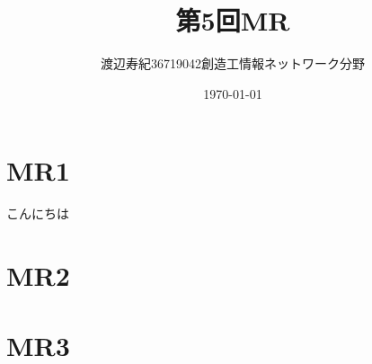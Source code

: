 \documentclass[12pt]{jarticle}
\title{第5回MR}%
\author{渡辺寿紀36719042創造工情報ネットワーク分野}
\date{\today}
\begin{document}
\maketitle

\section{MR1}
こんにちは


\section{MR2}


\section{MR3}
\end{document}
